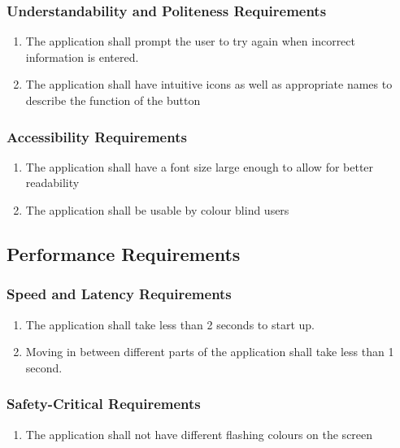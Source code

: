 \documentclass[]{article}
\begin{document}
\subsubsection{Understandability and Politeness Requirements}
\label{ssub:understandability_and_politeness_requirements}
\begin{enumerate}[{UH}1. ]
	\item The application shall prompt the user to try again when incorrect information is entered.
	\item The application shall have intuitive icons as well as appropriate names
to describe the function of the button
\end{enumerate}

\subsubsection{Accessibility Requirements}
\label{ssub:accessibility_requirements}
\begin{enumerate}[{UH}1. ]
	\item The application shall have a font size large enough to allow for better readability
	\item The application shall be usable by colour blind users
\end{enumerate}


\subsection{Performance Requirements}
\label{sub:performance_requirements}

\subsubsection{Speed and Latency Requirements}
\label{ssub:speed_and_latency_requirements}
\begin{enumerate}[{PR}1. ]
	\item The application shall take less than 2 seconds to start up.
	\item Moving in between different parts of the application shall take less than
1 second.
\end{enumerate}

\subsubsection{Safety-Critical Requirements}
\label{ssub:safety_critical_requirements}
\begin{enumerate}[{PR}1. ]
	\item The application shall not have different flashing colours on the screen
\end{enumerate}
\end{document}
